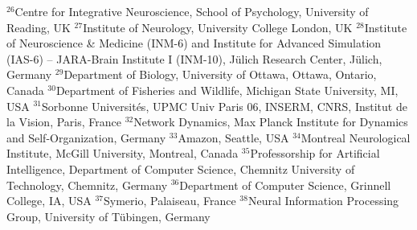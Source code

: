 $^{26}$Centre for Integrative Neuroscience, School of Psychology, University of Reading, UK
$^{27}$Institute of Neurology, University College London, UK
$^{28}$Institute of Neuroscience \& Medicine (INM-6) and Institute for Advanced Simulation (IAS-6) -- JARA-Brain Institute I (INM-10), Jülich Research Center, Jülich, Germany
$^{29}$Department of Biology, University of Ottawa, Ottawa, Ontario, Canada
$^{30}$Department of Fisheries and Wildlife, Michigan State University, MI, USA
$^{31}$Sorbonne Universités, UPMC Univ Paris 06, INSERM, CNRS, Institut de la Vision, Paris, France
$^{32}$Network Dynamics, Max Planck Institute for Dynamics and Self-Organization, Germany
$^{33}$Amazon, Seattle, USA
$^{34}$Montreal Neurological Institute, McGill University, Montreal, Canada
$^{35}$Professorship for Artificial Intelligence, Department of Computer Science, Chemnitz University of Technology, Chemnitz, Germany
$^{36}$Department of Computer Science, Grinnell College, IA, USA
$^{37}$Symerio, Palaiseau, France
$^{38}$Neural Information Processing Group, University of Tübingen, Germany
\par